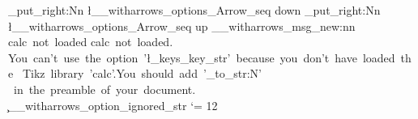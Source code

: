 \seq_put_right:Nn \l__witharrows_options_Arrow_seq { down }
\seq_put_right:Nn \l__witharrows_options_Arrow_seq { up }
\__witharrows_msg_new:nn { calc~not~loaded }
  {
    calc~not~loaded.\\
    You~can't~use~the~option~'\l_keys_key_str'~because~you~don't~have~loaded~the~
    Tikz~library~'calc'.You~should~add~'\token_to_str:N\usetikzlibrary{calc}'~
    ~in~the~preamble~of~your~document. \\
    \c__witharrows_option_ignored_str
  }
\catcode `\@ = 12
\ExplSyntaxOff
\endinput
